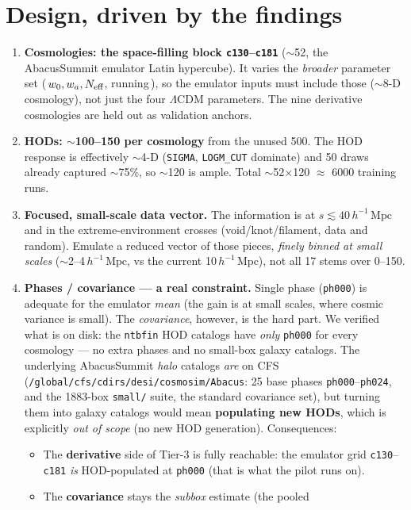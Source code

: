 \documentclass[11pt]{article}
\newcommand{\Mpch}{\,h^{-1}\,\mathrm{Mpc}}
\newcommand{\code}[1]{\texttt{#1}}
\begin{document}
\section{Design, driven by the findings}
\begin{enumerate}
\item \textbf{Cosmologies: the space-filling block \code{c130}--\code{c181}}
  ($\sim$52, the AbacusSummit emulator Latin hypercube).  It varies the
  \emph{broader} parameter set (\,$w_0,w_a,N_{\rm eff}$, running\,), so the
  emulator inputs must include those ($\sim$8-D cosmology), not just the four
  $\Lambda$CDM parameters.  The nine derivative cosmologies are held out as
  validation anchors.
\item \textbf{HODs: $\sim$100--150 per cosmology} from the unused 500.  The HOD
  response is effectively $\sim$4-D (\code{SIGMA}, \code{LOGM\_CUT} dominate) and
  50 draws already captured $\sim$75\%, so $\sim$120 is ample.  Total
  $\sim$52$\times$120 $\approx$ 6000 training runs.
\item \textbf{Focused, small-scale data vector.}  The information is at
  $s\lesssim40\Mpch$ and in the extreme-environment crosses (void/knot/filament,
  data and random).  Emulate a reduced vector of those pieces, \emph{finely
  binned at small scales} ($\sim$2--4$\Mpch$, vs the current 10$\Mpch$), not all
  17 stems over 0--150.
\item \textbf{Phases / covariance --- a real constraint.}  Single phase
  (\code{ph000}) is adequate for the emulator \emph{mean} (the gain is at small
  scales, where cosmic variance is small).  The \emph{covariance}, however, is the
  hard part.  We verified what is on disk: the \code{ntbfin} HOD catalogs have
  \emph{only} \code{ph000} for every cosmology --- no extra phases and no
  small-box galaxy catalogs.  The underlying AbacusSummit \emph{halo} catalogs
  \emph{are} on CFS (\code{/global/cfs/cdirs/desi/cosmosim/Abacus}: 25 base phases
  \code{ph000}--\code{ph024}, and the 1883-box \code{small/} suite, the standard
  covariance set), but turning them into galaxy catalogs would mean
  \textbf{populating new HODs}, which is explicitly \emph{out of scope} (no new
  HOD generation).  Consequences:
  \begin{itemize}
  \item The \textbf{derivative} side of Tier-3 is fully reachable: the emulator
    grid \code{c130}--\code{c181} \emph{is} HOD-populated at \code{ph000} (that is
    what the pilot runs on).
  \item The \textbf{covariance} stays the \emph{subbox} estimate (the pooled

\end{itemize}
\end{enumerate}
\end{document}
